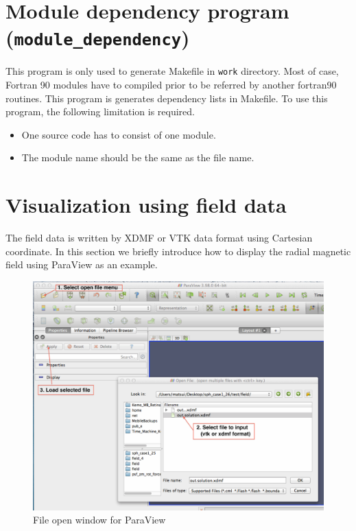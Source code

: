 \section{Module dependency program ({\tt module\_dependency})}
This program is only used to generate Makefile in {\tt work} directory. Most of case, Fortran 90 modules have to compiled prior to be referred by another fortran90 routines. This program is generates dependency lists in Makefile. To use this program, the following limitation is required.
\begin{itemize}
\item One source code has to consist of one module.
\item The module name should be the same as the file name.
\end{itemize}

\section{Visualization using field data}
\label{sec:paraview}
The field data is written by XDMF or VTK data format using Cartesian coordinate. In this section we briefly introduce how to display the radial magnetic field using ParaView as an example.
%
\begin{figure}[htbp]
\begin{center}
\includegraphics*[width=130mm]{images/paraview_open}
\caption{File open window for ParaView}
\label{fig:paraview_load}
\end{center}
\end{figure}
%

